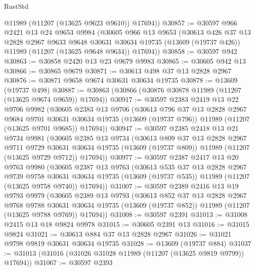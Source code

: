 \begin{lexlean}{RustStd}
\begin{coremodule}
        @11989
        (@11207 (@13625 @9623 @9610))
        @17694))
@30857 := @30597
    @966
    @2421
    @13
    @24
    @9653
    @9984
    (@30605
      @966
      @13
      @9653
      (@30613
        @426
        @37
        @13
        @2828
        @2967
        @9633
        @9648
        @30631
        @30634
        @19735
        (@13609 (@19737 @426))
        @11989
        (@11207 (@13625 @9648 @9634))
        @17694))
@30858 := @30597 @942
@30863 := @30858 @2420 @13 @23 @9679 @9983
@30865 := @30605 @942 @13
@30866 := @30865 @9679
@30871 := @30613 @498 @37 @13 @2828 @2967
@30876 := @30871 @9658 @9674 @30631 @30634 @19735
@30878 := @13609 (@19737 @498)
@30887 := @30863 (@30866 (@30876 @30878 @11989 (@11207 (@13625 @9674 @9659)) @17694))
@30917 := @30597
    @2383
    @2419
    @13
    @22
    @9706
    @9982
    (@30605
      @2383
      @13
      @9706
      (@30613
        @796
        @37
        @13
        @2828
        @2967
        @9684
        @9701
        @30631
        @30634
        @19735
        (@13609 (@19737 @796))
        @11989
        (@11207 (@13625 @9701 @9685))
        @17694))
@30947 := @30597
    @2385
    @2418
    @13
    @21
    @9734
    @9981
    (@30605
      @2385
      @13
      @9734
      (@30613
        @809
        @37
        @13
        @2828
        @2967
        @9711
        @9729
        @30631
        @30634
        @19735
        (@13609 (@19737 @809))
        @11989
        (@11207 (@13625 @9729 @9712))
        @17694))
@30977 := @30597
    @2387
    @2417
    @13
    @20
    @9763
    @9980
    (@30605
      @2387
      @13
      @9763
      (@30613
        @535
        @37
        @13
        @2828
        @2967
        @9739
        @9758
        @30631
        @30634
        @19735
        (@13609 (@19737 @535))
        @11989
        (@11207 (@13625 @9758 @9740))
        @17694))
@31007 := @30597
    @2389
    @2416
    @13
    @19
    @9793
    @9979
    (@30605
      @2389
      @13
      @9793
      (@30613
        @852
        @37
        @13
        @2828
        @2967
        @9768
        @9788
        @30631
        @30634
        @19735
        (@13609 (@19737 @852))
        @11989
        (@11207 (@13625 @9788 @9769))
        @17694))
@31008 := @30597 @2391
@31013 := @31008 @2415 @13 @18 @9824 @9978
@31015 := @30605 @2391 @13
@31016 := @31015 @9824
@31021 := @30613 @884 @37 @13 @2828 @2967
@31026 := @31021 @9798 @9819 @30631 @30634 @19735
@31028 := @13609 (@19737 @884)
@31037 := @31013 (@31016 (@31026 @31028 @11989 (@11207 (@13625 @9819 @9799)) @17694))
@31067 := @30597
    @2393

\end{coremodule}
\end{lexlean}

